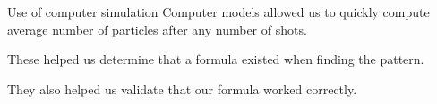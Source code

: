 \documentclass[xcolor={usenames,dvipsnames}]{beamer}
\begin{document}
\begin{frame}{Use of computer simulation}
  Computer models allowed us to quickly compute average number of particles after any number of shots.

  These helped us determine that a formula existed when finding the pattern.

  They also helped us validate that our formula worked correctly.
\end{frame}
\end{document}
